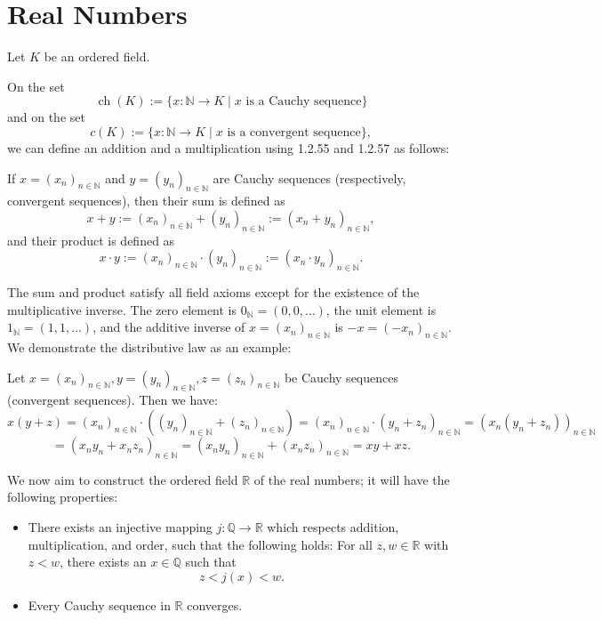 \newpage
\section{Real Numbers}

Let \( K \) be an ordered field.

On the set
		\[
			\operatorname{ch}(K) := \{ x : \mathbb{N} \to K \mid x \text{ is a Cauchy sequence} \}
		\]
		and on the set
		\[
			c(K) := \{ x : \mathbb{N} \to K \mid x \text{ is a convergent sequence} \},
		\]
		we can define an addition and a multiplication using 1.2.55 and 1.2.57 as follows:

		If \( x = {(x_n)}_{n \in \mathbb{N}} \) and \( y = {(y_n)}_{n \in \mathbb{N}} \) are Cauchy sequences (respectively, convergent sequences), then their sum is defined as
		\[
			x + y := {(x_n)}_{n \in \mathbb{N}} + {(y_n)}_{n \in \mathbb{N}} := {(x_n + y_n)}_{n \in \mathbb{N}},
		\]
		and their product is defined as
		\[
			x \cdot y := {(x_n)}_{n \in \mathbb{N}} \cdot {(y_n)}_{n \in \mathbb{N}} := {(x_n \cdot y_n)}_{n \in \mathbb{N}}.
		\]

The sum and product satisfy all field axioms except for the existence of the multiplicative inverse.
The zero element is \( 0_{\mathbb{N}} = (0, 0, \ldots) \), the unit element is \( 1_{\mathbb{N}} = (1, 1, \ldots) \), and the additive inverse of \( x = {(x_n)}_{n \in \mathbb{N}} \) is \( -x = {(-x_n)}_{n \in \mathbb{N}} \).
We demonstrate the distributive law as an example:

Let \( x = {(x_n)}_{n \in \mathbb{N}}, y = {(y_n)}_{n \in \mathbb{N}}, z = {(z_n)}_{n \in \mathbb{N}} \) be Cauchy sequences (convergent sequences). Then we have:
\[
	x(y + z) = {(x_n)}_{n \in \mathbb{N}} \cdot \left( {(y_n)}_{n \in \mathbb{N}} + {(z_n)}_{n \in \mathbb{N}} \right)
	= {(x_n)}_{n \in \mathbb{N}} \cdot {(y_n + z_n)}_{n \in \mathbb{N}}
	= {(x_n (y_n + z_n))}_{n \in \mathbb{N}}
\]
\[
	= {(x_n y_n + x_n z_n)}_{n \in \mathbb{N}}
	= {(x_n y_n)}_{n \in \mathbb{N}} + {(x_n z_n)}_{n \in \mathbb{N}}
	= xy + xz.
\]

We now aim to construct the ordered field \( \mathbb{R} \) of the real numbers;
it will have the following properties:

\begin{itemize}[label=\(-\)]
	\item There exists an injective mapping \( j : \mathbb{Q} \to \mathbb{R} \) which respects addition, multiplication, and order, such that the following holds:
		For all \( z, w \in \mathbb{R} \) with \( z < w \), there exists an \( x \in \mathbb{Q} \) such that
		\[
			z < j(x) < w.
		\]

	\item Every Cauchy sequence in \( \mathbb{R} \) converges.

\end{itemize}

